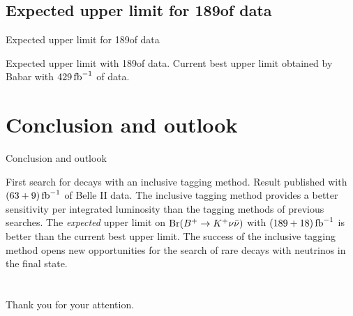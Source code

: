 \subsection*{Expected upper limit for 189\invfb of data}
\begin{frame}{Expected upper limit for 189\invfb of data}
\bi
\item Expected upper limit with 189\invfb of data.
\bi
{}
\ei
\itemi Current best upper limit obtained by Babar with $429\mbox{\,fb}^{-1}$ of data.
\bi
{} 
\ei
\ei
\end{frame}
\section{Conclusion and outlook}
\begin{frame}{Conclusion and outlook}
\bi
\item First search for \BKnn decays with an inclusive tagging method.
\itemii Result published with $(63+9)\mbox{\,fb}^{-1}$ of Belle II data.
\bi
{}
\ei
\itemii The inclusive tagging method provides a better sensitivity per integrated luminosity than the tagging methods of previous searches.
\itemii The \textit{expected} upper limit on $\mathrm{Br}(B^+\rightarrow K^+\nu\bar{\nu})$ with $(189+18)\mbox{\,fb}^{-1}$ is better than the current best upper limit.
\itemii The success of the inclusive tagging method opens new opportunities for the search of rare decays with neutrinos in the final state.
\ei
\end{frame}
\section*{}
\begin{frame}{}
\centering
{\Large Thank you for your attention.}\\ 


\end{frame}
